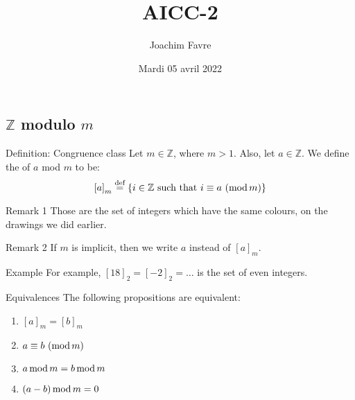 \documentclass[a4paper]{article}
\title{AICC-2}
\author{Joachim Favre}
\date{Mardi 05 avril 2022}
\begin{document}
\maketitle


\subsection{$\mathbb{Z}$ modulo $m$}

\begin{parag}{Definition: Congruence class}
    Let $m \in\mathbb{Z}$, where $m > 1$. Also, let $a \in \mathbb{Z}$. We define the  of $a$ mod $m$ to be: 
    \[\left[a\right]_m \over{=}{def} \left\{i \in\mathbb{Z} \text{ such that } \congruent{i}{a}{m}\right\}\]
    
    \begin{subparag}{Remark 1}
        Those are the set of integers which have the same colours, on the drawings we did earlier.
    \end{subparag}
    
    \begin{subparag}{Remark 2}
        If $m$ is implicit, then we write $a$ instead of $\left[a\right]_m$.
    \end{subparag}
    

    \begin{subparag}{Example}
        For example, $\left[18\right]_2 = \left[-2\right]_2 = \ldots$ is the set of even integers. 
    \end{subparag}
\end{parag}

\begin{parag}{Equivalences}
    The following propositions are equivalent:
    \begin{enumerate}
        \item $\left[a\right]_m = \left[b\right]_m$
        \item $a \equiv b\ (\operatorname{mod} m)$
        \item $a \operatorname{mod} m = b \operatorname{mod} m$ 
        \item $\left(a - b\right) \Mod m = 0$
    \end{enumerate}
\end{parag}
\end{document}
